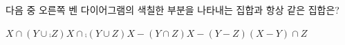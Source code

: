 \noindent\begin{minipage}[t]{0.58\linewidth}\vspace{0pt}\raggedright 다음 중 오른쪽 벤 다이어그램의 색칠한 부분을 나타내는 집합과 항상 같은 집합은?\end{minipage}\hfill\begin{minipage}[t]{0.4\linewidth}\vspace{0pt}\centering \resizebox{\ifdim\width>\linewidth\linewidth\else\width\fi}{!}{}\end{minipage}\par
\begin{choicesv}{$X\cap(Y\cup\comp{Z})$}{$X\cap\comp{(Y\cup Z)}$}{$X-(Y\cap Z)$}{$X-(Y-Z)$}{$(X-Y)\cap Z$}\end{choicesv}
